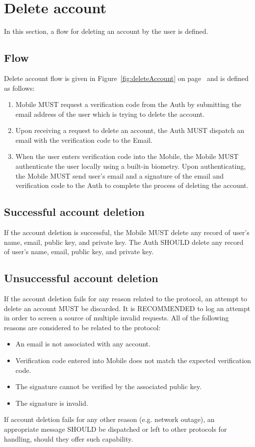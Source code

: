 \section{Delete account}
In this section, a flow for deleting an account by the user is defined. 

    \subsection{Flow}
    Delete account flow is given in Figure~\ref{fig:deleteAccount} on page~\pageref{fig:deleteAccount} and is defined 
    as follows:
        \begin{enumerate}
            \item Mobile MUST request a verification code from the Auth by submitting the email address of the user
                  which is trying to delete the account.
            \item Upon receiving a request to delete an account, the Auth MUST dispatch an email with the verification
                  code to the Email.
            \item When the user enters verification code into the Mobile, the Mobile MUST authenticate the user locally 
                  using a built-in biometry. Upon authenticating, the Mobile MUST send user's email and a signature 
                  of the email and verification code to the Auth to complete the process of deleting the account.
        \end{enumerate}
        
    
    \subsection{Successful account deletion}
    If the account deletion is successful, the Mobile MUST delete any record of user's name, email, public key, and 
    private key. The Auth SHOULD delete any record of user's name, email, public key, and private key.

    \subsection{Unsuccessful account deletion}
    If the account deletion fails for any reason related to the protocol, an attempt to delete an account MUST be 
    discarded. It is RECOMMENDED to log an attempt in order to screen a source of multiple invalid requests. 
    All of the following reasons are considered to be related to the protocol:
        \begin{itemize}
            \item An email is not associated with any account.
            \item Verification code entered into Mobile does not match the expected verification code.
            \item The signature cannot be verified by the associated public key.
            \item The signature is invalid.
        \end{itemize}
    If account deletion fails for any other reason (e.g. network outage), an appropriate message SHOULD be dispatched or 
    left to other protocols for handling, should they offer such capability.
